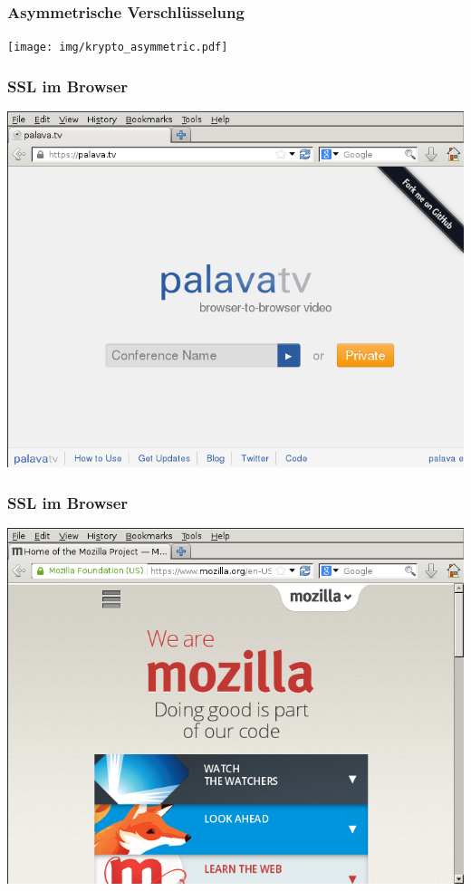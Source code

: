 \documentclass[12pt]{beamer}
\begin{document}
\begin{frame}
    \frametitle{Asymmetrische Verschlüsselung}
    \texttt{[image: img/krypto\_asymmetric.pdf]}
\end{frame}


\begin{frame}
    \frametitle{SSL im Browser}
    \includegraphics[height=0.7\textheight]{img/ssl_verified.png}
\end{frame}

\begin{frame}
    \frametitle{SSL im Browser}
    \includegraphics[height=0.7\textheight]{img/ssl_special.png}
\end{frame}
\end{document}
